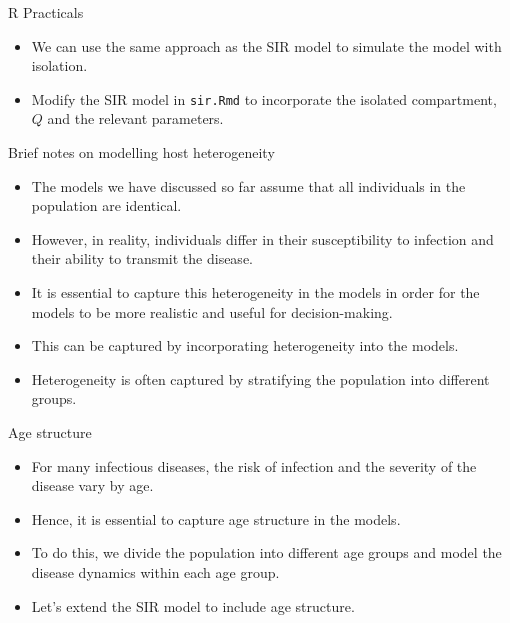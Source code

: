 \documentclass[
  ignorenonframetext,
]{beamer}
\providecommand{\tightlist}{%
  \setlength{\itemsep}{0pt}\setlength{\parskip}{0pt}}\usepackage{longtable,booktabs,array}
\begin{document}
\begin{frame}[fragile]
\begin{block}{R Practicals}
\label{r-practicals-3}
\begin{itemize}
\tightlist
\item
  We can use the same approach as the SIR model to simulate the model
  with isolation.
\item
  Modify the SIR model in \texttt{sir.Rmd} to incorporate the isolated
  compartment, \(Q\) and the relevant parameters.
\end{itemize}
\end{block}
\end{frame}

\begin{frame}{Brief notes on modelling host heterogeneity}
\label{brief-notes-on-modelling-host-heterogeneity}
\begin{itemize}
\item
  The models we have discussed so far assume that all individuals in the
  population are identical.
\item
  However, in reality, individuals differ in their susceptibility to
  infection and their ability to transmit the disease.
\item
  It is essential to capture this heterogeneity in the models in order
  for the models to be more realistic and useful for decision-making.
\end{itemize}
\end{frame}

\begin{frame}
\begin{itemize}
\item
  This can be captured by incorporating heterogeneity into the models.
\item
  Heterogeneity is often captured by stratifying the population into
  different groups.
\end{itemize}
\end{frame}

\begin{frame}
\begin{block}{Age structure}
\label{age-structure}
\begin{itemize}
\item
  For many infectious diseases, the risk of infection and the severity
  of the disease vary by age.
\item
  Hence, it is essential to capture age structure in the models.
\item
  To do this, we divide the population into different age groups and
  model the disease dynamics within each age group.
\item
  Let's extend the SIR model to include age structure.
\end{itemize}
\end{block}
\end{frame}
\end{document}
